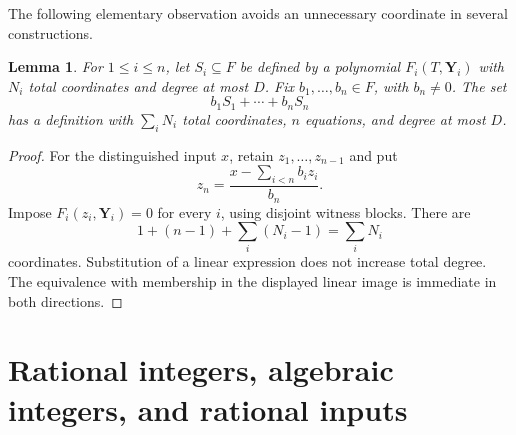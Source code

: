 \documentclass[11pt,a4paper]{article}
\newtheorem{lemma}[theorem]{Lemma}
\theoremstyle{definition}
\begin{document}
The following elementary observation avoids an unnecessary
coordinate in several constructions.

\begin{lemma}\label{lem:linear-image}
For $1\le i\le n$, let $S_i\subseteq F$ be defined by a polynomial
$F_i(T,\mathbf Y_i)$ with $N_i$ total coordinates and degree at most
$D$. Fix $b_1,\ldots,b_n\in F$, with $b_n\ne0$. The set
\[
              b_1S_1+\cdots+b_nS_n
\]
has a definition with $\sum_iN_i$ total coordinates, $n$ equations,
and degree at most $D$.
\end{lemma}
\begin{proof}
For the distinguished input $x$, retain $z_1,\ldots,z_{n-1}$ and
put
\[
               z_n=\frac{x-\sum_{i<n}b_i z_i}{b_n}.
\]
Impose $F_i(z_i,\mathbf Y_i)=0$ for every $i$, using disjoint
witness blocks. There are
\[
          1+(n-1)+\sum_i(N_i-1)=\sum_iN_i
\]
coordinates. Substitution of a linear expression does not increase
total degree. The equivalence with membership in the displayed
linear image is immediate in both directions.
\end{proof}

\section{Rational integers, algebraic integers, and rational inputs}
\end{document}
